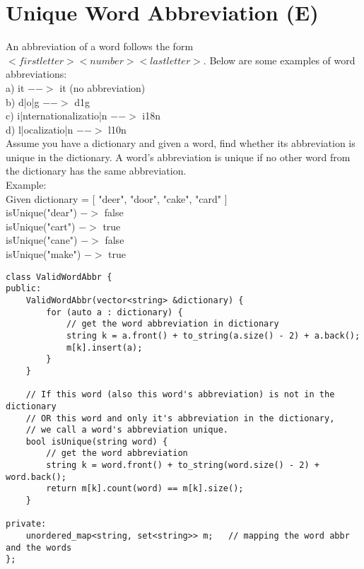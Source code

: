 \section{Unique Word Abbreviation (E)}
An abbreviation of a word follows the form $<first letter><number><last letter>$. Below are some examples of word abbreviations:\\

a) it                     $ -->$ it    (no abbreviation)\\

b) d|o|g                   $-->$ d1g\\

c) i|nternationalizatio|n  $-->$ i18n\\

d) l|ocalizatio|n          $-->$ l10n\\

Assume you have a dictionary and given a word, find whether its abbreviation is unique in the dictionary. A word's abbreviation is unique if no other word from the dictionary has the same abbreviation.\\

Example: \\
Given dictionary = [ "deer", "door", "cake", "card" ]\\
isUnique("dear") $->$ false\\
isUnique("cart") $->$ true\\
isUnique("cane") $->$ false\\
isUnique("make") $->$ true\\

\begin{lstlisting}
class ValidWordAbbr {
public:
    ValidWordAbbr(vector<string> &dictionary) {
        for (auto a : dictionary) {
            // get the word abbreviation in dictionary
            string k = a.front() + to_string(a.size() - 2) + a.back(); 
            m[k].insert(a);
        }
    }
    
    // If this word (also this word's abbreviation) is not in the dictionary 
    // OR this word and only it's abbreviation in the dictionary,
    // we call a word's abbreviation unique.
    bool isUnique(string word) {
        // get the word abbreviation
        string k = word.front() + to_string(word.size() - 2) + word.back();
        return m[k].count(word) == m[k].size();
    }
    
private:
    unordered_map<string, set<string>> m;   // mapping the word abbr and the words
};
\end{lstlisting}


